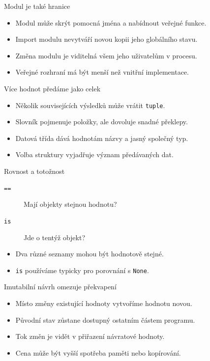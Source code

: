 \documentclass[aspectratio=169]{beamer}
\begin{document}
\begin{frame}{Modul je také hranice}
\begin{itemize}
\item Modul může skrýt pomocná jména a nabídnout veřejné funkce.
\item Import modulu nevytváří novou kopii jeho globálního stavu.
\item Změna modulu je viditelná všem jeho uživatelům v procesu.
\item Veřejné rozhraní má být menší než vnitřní implementace.
\end{itemize}
\end{frame}

\begin{frame}{Více hodnot předáme jako celek}
\begin{itemize}
\item Několik souvisejících výsledků může vrátit \texttt{tuple}.
\item Slovník pojmenuje položky, ale dovoluje snadné překlepy.
\item Datová třída dává hodnotám názvy a jasný společný typ.
\item Volba struktury vyjadřuje význam předávaných dat.
\end{itemize}
\end{frame}

\begin{frame}{Rovnost a totožnost}
\begin{description}
\item[\texttt{==}] Mají objekty stejnou hodnotu?
\item[\texttt{is}] Jde o tentýž objekt?
\end{description}
\begin{itemize}
\item Dva různé seznamy mohou být hodnotově stejné.
\item \texttt{is} používáme typicky pro porovnání s \texttt{None}.
\end{itemize}
\end{frame}

\begin{frame}{Imutabilní návrh omezuje překvapení}
\begin{itemize}
\item Místo změny existující hodnoty vytvoříme hodnotu novou.
\item Původní stav zůstane dostupný ostatním částem programu.
\item Tok změn je vidět v přiřazení návratové hodnoty.
\item Cena může být vyšší spotřeba paměti nebo kopírování.
\end{itemize}
\end{frame}
\end{document}
